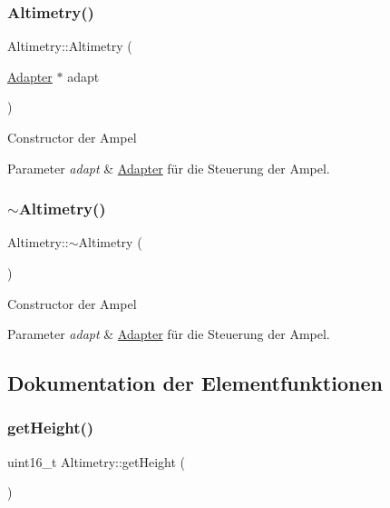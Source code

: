 \subsubsection{\texorpdfstring{Altimetry()}{Altimetry()}}
{\footnotesize\ttfamily Altimetry\+::\+Altimetry (\begin{DoxyParamCaption}\item[{\hyperlink{class_adapter}{Adapter} $\ast$}]{adapt }\end{DoxyParamCaption})}

Constructor der Ampel


\begin{DoxyParams}{Parameter}
{\em adapt} & \hyperlink{class_adapter}{Adapter} für die Steuerung der Ampel. \\
\hline
\end{DoxyParams}
\hypertarget{class_altimetry_a242b63ebcecf578d9cbc0b80d30bbc2f}{}\label{class_altimetry_a242b63ebcecf578d9cbc0b80d30bbc2f} 
\subsubsection{\texorpdfstring{$\sim$\+Altimetry()}{~Altimetry()}}
{\footnotesize\ttfamily Altimetry\+::$\sim$\+Altimetry (\begin{DoxyParamCaption}{ }\end{DoxyParamCaption})\hspace{0.3cm}{\ttfamily [virtual]}}

Constructor der Ampel


\begin{DoxyParams}{Parameter}
{\em adapt} & \hyperlink{class_adapter}{Adapter} für die Steuerung der Ampel. \\
\hline
\end{DoxyParams}


\subsection{Dokumentation der Elementfunktionen}
\hypertarget{class_altimetry_a502ab1622b12f938ca61dc40d6a15e07}{}\label{class_altimetry_a502ab1622b12f938ca61dc40d6a15e07} 
\subsubsection{\texorpdfstring{get\+Height()}{getHeight()}}
{\footnotesize\ttfamily uint16\+\_\+t Altimetry\+::get\+Height (\begin{DoxyParamCaption}{ }\end{DoxyParamCaption})}

